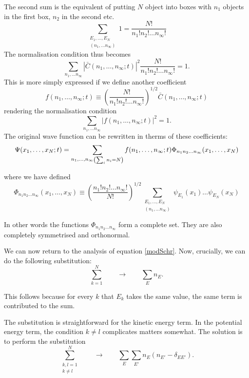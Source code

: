 The second sum is the equivalent of putting $N$ object into boxes with $n_1$ objects in the first box, $n_2$ in the second etc.
\[ \sum_{\substack{E_1, \ldots, E_N \\ (n_1, \ldots n_\infty)}} 1 = \frac{N!}{n_1!n_2!\ldots n_\infty !}\]
The normalisation condition thus becomes
\[ \sum_{n_1, \ldots n_\infty}|\bar{C}(n_1,\ldots,n_\infty; t)|^2\frac{N!}{n_1!n_2!\ldots n_\infty !} = 1. \]
This is more simply expressed if we define another coefficient
\[ f(n_1,\ldots,n_\infty; t) \equiv \left(\frac{N!}{n_1!n_2!\ldots n_\infty !}\right)^{1/2}\bar{C}(n_1,\ldots,n_\infty; t) \]
rendering the normalisation condition
\[ \sum_{n_1, \ldots n_\infty}|f(n_1,\ldots,n_\infty; t)|^2 = 1. \]
The original wave function can be rewritten in therms of these coefficients:
\begin{equation}
\Psi(x_1, \ldots, x_N; t) =  \sum_{\substack{n_1,\ldots, n_\infty} \\ \left(\sum_i n_i = N\right)} f(n_1,\ldots,n_\infty; t) \Phi_{n_1n_2\ldots n_\infty}(x_1,\ldots, x_N) 
\label{psiOccNum}
\end{equation}

where we have defined
\[ \Phi_{n_1n_2\ldots n_\infty}(x_1,\ldots, x_N) \equiv \left(\frac{n_1!n_2!\ldots n_\infty !}{N!}\right)^{1/2}\sum_{\substack{E_1, \ldots, E_N \\ (n_1, \ldots n_\infty)}}\psi_{E_1}(x_1)\ldots \psi_{E_N}(x_N) \]

In other words the functions $\Phi_{n_1n_2\ldots n_\infty}$ form a complete set. They are also completely symmetrised and orthonormal. 

We can now return to the analysis of equation \ref{modSchr}. Now, crucially, we can do the following substitution:
\begin{equation}
\sum^N_{k=1} \qquad \to \qquad \sum_E n_E. \label{sub1}
\end{equation}

This follows because for every $k$ that $E_k$ takes the same value, the same term is contributed to the sum.

The substitution is straightforward for the kinetic energy term. In the potential energy term, the condition $k \neq l$ complicates matters somewhat.  The solution is to perform the substitution
\begin{equation}
\sum^N_{\substack{k,l=1 \\ k \neq l}} \qquad \to \qquad \sum_E\sum_{E'} n_E(n_{E'} - \delta_{EE'}). \label{sub2}
\end{equation}


